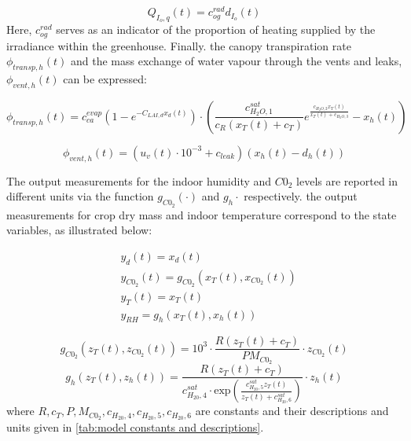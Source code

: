 \begin{equation}
	Q_{I_o,q}(t) = c_{og}^{rad} d_{I_o}(t)
\end{equation}
Here, $c_{og}^{rad}$ serves as an indicator of the proportion of heating supplied by the irradiance within the greenhouse. Finally. the canopy transpiration rate $\phi_{transp,h}(t)$ and the mass exchange of water vapour through the vents and leaks, $\phi_{vent,h}(t)$ can be expressed:

\begin{equation}
	\phi_{transp,h}(t) = c_{ca}^{evap}(1 - e^{-C_{LAI,d} x_d(t)})\cdot \left( \frac{c_{H_2O,1}^{sat}}{c_R(x_T(t)+c_T)} e^{\frac{c_{H_2O,2}x_T(t)}{x_T(t) + c_{H_2O,3}}} - x_h(t) \right)
\end{equation}

\begin{equation}
	\phi_{vent,h}(t) = (u_v(t) \cdot 10^{-3} + c_{leak})(x_h(t) - d_h(t))
\end{equation}


The output measurements for the indoor humidity and $C0_2$ levels are reported in different units via the function $g_{C0_2}(\cdot)$ and $g_h{\cdot}$ respectively.  the output measurements for crop dry mass and indoor temperature correspond to the state variables, as illustrated below:

\begin{equation}
	\begin{aligned}
		& y_d(t) = x_d(t) 
		\\
		& y_{C0_2}(t) = g_{C0_2}(x_T(t),x_{C0_2}(t))
		\\
		& y_T (t) = x_T(t)
		\\
		& y_{RH} = g_h (x_T(t),x_h(t))
	\end{aligned}
\end{equation}

\begin{equation}
	g_{C0_2}(z_T(t),z_{C0_2}(t)) = 10^3 \cdot \frac{R(z_T(t) + c_T)}{PM_{C0_2}} \cdot z_{C0_2}(t)
\end{equation}
\begin{equation}
	g_h (z_T(t),z_h(t)) = \frac{R(z_T(t) + c_T)}{c_{H_20,4}^{sat}\cdot \text{exp}(\frac{c_{H_20,5}^{sat}z_T(t)}{z_T(t) + c_{H_20,6}^{sat}})} \cdot z_{h}(t)
\end{equation}
where $R,c_T,P,M_{C0_2},c_{H_20,4},c_{H_20,5},c_{H_20,6}$ are constants and their descriptions and units given in \autoref{tab:model constants and descriptions}.

